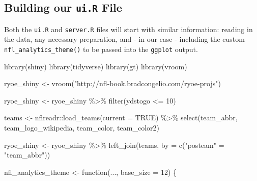 \documentclass[
  letterpaper,
]{krantz}
\newenvironment{Shaded}{\begin{snugshade}}{\end{snugshade}}
\newcommand{\AttributeTok}[1]{\textcolor[rgb]{0.40,0.45,0.13}{#1}}
\newcommand{\ConstantTok}[1]{\textcolor[rgb]{0.56,0.35,0.01}{#1}}
\newcommand{\ControlFlowTok}[1]{\textcolor[rgb]{0.00,0.23,0.31}{#1}}
\newcommand{\DecValTok}[1]{\textcolor[rgb]{0.68,0.00,0.00}{#1}}
\newcommand{\FunctionTok}[1]{\textcolor[rgb]{0.28,0.35,0.67}{#1}}
\newcommand{\NormalTok}[1]{\textcolor[rgb]{0.00,0.23,0.31}{#1}}
\newcommand{\OtherTok}[1]{\textcolor[rgb]{0.00,0.23,0.31}{#1}}
\newcommand{\SpecialCharTok}[1]{\textcolor[rgb]{0.37,0.37,0.37}{#1}}
\newcommand{\StringTok}[1]{\textcolor[rgb]{0.13,0.47,0.30}{#1}}
\begin{document}
\hypertarget{building-our-ui.r-file}{%
\subsection{\texorpdfstring{Building our \texttt{ui.R}
File}{Building our ui.R File}}\label{building-our-ui.r-file}}

Both the \texttt{ui.R} and \texttt{server.R} files will start with
similar information: reading in the data, any necessary preparation, and
- in our case - including the custom \texttt{nfl\_analytics\_theme()} to
be passed into the \texttt{ggplot} output.

\begin{Shaded}
\begin{Highlighting}[]
\FunctionTok{library}\NormalTok{(shiny)}
\FunctionTok{library}\NormalTok{(tidyverse)}
\FunctionTok{library}\NormalTok{(gt)}
\FunctionTok{library}\NormalTok{(vroom)}

\NormalTok{ryoe\_shiny }\OtherTok{\textless{}{-}} \FunctionTok{vroom}\NormalTok{(}\StringTok{"http://nfl{-}book.bradcongelio.com/ryoe{-}projs"}\NormalTok{)}

\NormalTok{ryoe\_shiny }\OtherTok{\textless{}{-}}\NormalTok{ ryoe\_shiny }\SpecialCharTok{\%\textgreater{}\%}
  \FunctionTok{filter}\NormalTok{(ydstogo }\SpecialCharTok{\textless{}=} \DecValTok{10}\NormalTok{)}

\NormalTok{teams }\OtherTok{\textless{}{-}}\NormalTok{ nflreadr}\SpecialCharTok{::}\FunctionTok{load\_teams}\NormalTok{(}\AttributeTok{current =} \ConstantTok{TRUE}\NormalTok{) }\SpecialCharTok{\%\textgreater{}\%}
  \FunctionTok{select}\NormalTok{(team\_abbr, team\_logo\_wikipedia, team\_color, team\_color2)}

\NormalTok{ryoe\_shiny }\OtherTok{\textless{}{-}}\NormalTok{ ryoe\_shiny }\SpecialCharTok{\%\textgreater{}\%}
  \FunctionTok{left\_join}\NormalTok{(teams, }\AttributeTok{by =} \FunctionTok{c}\NormalTok{(}\StringTok{"posteam"} \OtherTok{=} \StringTok{"team\_abbr"}\NormalTok{))}

\NormalTok{nfl\_analytics\_theme }\OtherTok{\textless{}{-}} \ControlFlowTok{function}\NormalTok{(..., }\AttributeTok{base\_size =} \DecValTok{12}\NormalTok{) \{}
  

\end{Highlighting}
\end{Shaded}
\end{document}
